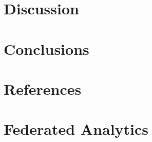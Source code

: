 \documentclass[11pt,a4paper,oneside]{report}
\newcommand{\instructions}[1]{{\color{orange}\itshape #1}}
\renewcommand{\instructions}[1]{} %
\begin{document}



\chapter{Discussion}
\label{discussion}

\instructions{The discussion section is where you interpret and compare the
    results. The objective is to point out the features and limitations of
    the work. Relate your results to current knowledge in the field and to
    the original purpose for undertaking the project.}




\chapter{Conclusions}
\label{conclusions}

\instructions{This section is written to put the interpretation of the results
    into the context of the original problem.~ Do not repeat the discussion
    points or include irrelevant material. The conclusion should be based on
    the evidence presented.}




\chapter*{References}
\label{references}


\instructions{Many bibliographic styles are acceptable for publications
    in the natural sciences. This template uses a numeric style defined in biblatex
    and that is common in Physics, Mathematics, and Computer Science papers.}

\printbibliography[heading=none]


\appendix

\chapter{Federated Analytics}
\label{app:fa}
\end{document}
